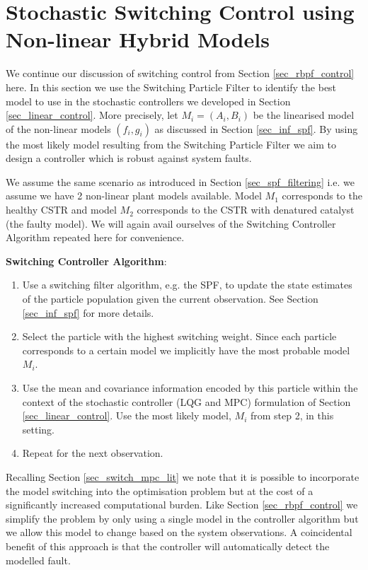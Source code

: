 \chapter{Stochastic Switching Control using Non-linear Hybrid Models}
\label{sec_spf_control}
We continue our discussion of switching control from Section \ref{sec_rbpf_control} here. In this section we use the Switching Particle Filter to identify the best model to use in the stochastic controllers we developed in Section \ref{sec_linear_control}. More precisely, let $M_i = (A_i, B_i)$ be the linearised model of the non-linear models $(f_i, g_i)$ as discussed in Section \ref{sec_inf_spf}. By using the most likely model resulting from the Switching Particle Filter we aim to design a controller which is robust against system faults.

We assume the same scenario as introduced in Section \ref{sec_spf_filtering} i.e. we assume we have 2 non-linear plant models available. Model $M_1$ corresponds to the healthy CSTR and model $M_2$ corresponds to the CSTR with denatured catalyst (the faulty model). We will again avail ourselves of the Switching Controller Algorithm  repeated here for convenience.

\textbf{Switching Controller Algorithm}:
\begin{enumerate}
\item
Use a switching filter algorithm, e.g. the SPF, to update the state estimates of the particle population given the current observation. See Section \ref{sec_inf_spf} for more details.
\item
Select the particle with the highest switching weight. Since each particle corresponds to a certain model we implicitly have the most probable model $M_i$.
\item
Use the mean and covariance information encoded by this particle within the context of the stochastic controller (LQG and MPC) formulation of Section \ref{sec_linear_control}. Use the most likely model, $M_i$ from step 2, in this setting.
\item
Repeat for the next observation. 
\end{enumerate} 
Recalling Section \ref{sec_switch_mpc_lit} we note that it is possible to incorporate the model switching into the optimisation problem but at the cost of a significantly increased computational burden. Like Section \ref{sec_rbpf_control} we simplify the problem by only using a single model in the controller algorithm but we allow this model to change based on the system observations. A coincidental benefit of this approach is that the controller will automatically detect the modelled fault. 

